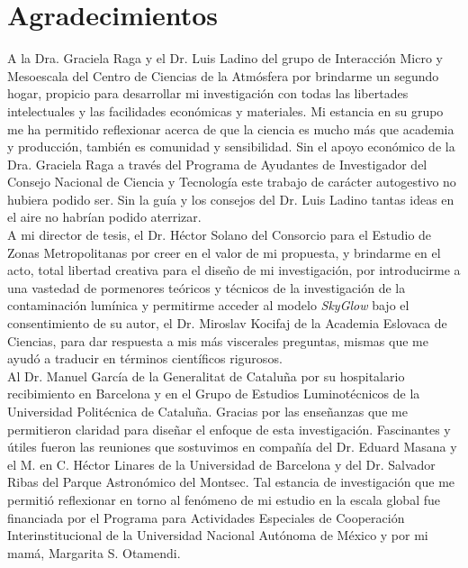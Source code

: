 \chapter{Agradecimientos}

A la Dra. Graciela Raga y el Dr. Luis Ladino del grupo de Interacción Micro y Mesoescala del Centro de Ciencias de la Atmósfera por brindarme un segundo hogar, propicio para desarrollar mi investigación con todas las libertades intelectuales y las facilidades económicas y materiales. Mi estancia en su grupo me ha permitido reflexionar acerca de que la ciencia es mucho más que academia y producción, también es comunidad y sensibilidad. Sin el apoyo económico de la Dra. Graciela Raga a través del Programa de Ayudantes de Investigador del Consejo Nacional de Ciencia y Tecnología este trabajo de carácter autogestivo no hubiera podido ser. Sin la guía y los consejos del Dr. Luis Ladino tantas ideas en el aire no habrían podido aterrizar.\\

A mi director de tesis, el Dr. Héctor Solano del Consorcio para el Estudio de Zonas Metropolitanas por creer en el valor de mi propuesta, y brindarme en el acto, total libertad creativa para el diseño de mi investigación, por introducirme a una vastedad de pormenores teóricos y técnicos de la investigación de la contaminación lumínica y permitirme acceder al modelo \textit{SkyGlow} bajo el consentimiento de su autor, el Dr. Miroslav Kocifaj de la Academia Eslovaca de Ciencias, para dar respuesta a mis más viscerales preguntas, mismas que me ayudó a traducir en términos científicos rigurosos.\\

Al Dr. Manuel García de la Generalitat de Cataluña por su hospitalario recibimiento en Barcelona y en el Grupo de Estudios Luminotécnicos de la Universidad Politécnica de Cataluña. Gracias por las enseñanzas que me permitieron claridad para diseñar el enfoque de esta investigación. Fascinantes y útiles fueron las reuniones que sostuvimos en compañía del Dr. Eduard Masana y el M. en C. Héctor Linares de la Universidad de Barcelona y del Dr. Salvador Ribas del Parque Astronómico del Montsec. Tal estancia de investigación que me permitió reflexionar en torno al fenómeno de mi estudio en la escala global fue financiada por el Programa para Actividades Especiales de Cooperación Interinstitucional de la Universidad Nacional Autónoma de México y por mi mamá, Margarita S. Otamendi.\\


